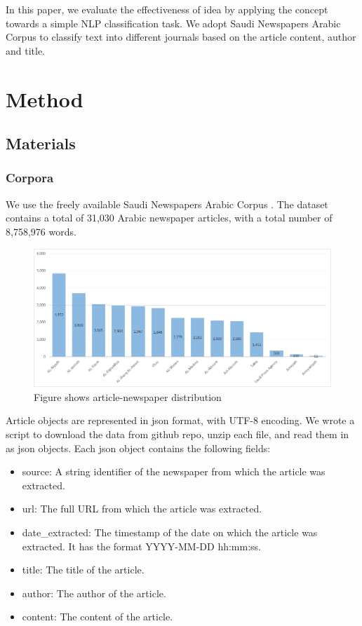 \documentclass[12pt]{article}
\begin{document}
In this paper, we evaluate the effectiveness of idea by applying the concept towards a simple NLP classification task. We adopt Saudi Newspapers Arabic Corpus \cite{hagrima2015} to classify text into different journals based on the article content, author and title.

\section{Method}\label{method}
\subsection{Materials}
\subsubsection{Corpora}
We use the freely available Saudi Newspapers Arabic Corpus \cite{hagrima2015}. The dataset contains a total of 31,030 Arabic newspaper articles, with a total number of 8,758,976 words. 

\begin{figure}[h!]
\centering
\includegraphics[width=\textwidth]{figures/article-newspaper_distribution.png}
\caption{Figure shows article-newspaper distribution}
\end{figure}

Article objects are represented in json format, with UTF-8 encoding. We wrote a script to download the data from github repo, unzip each file, and read them in as json objects. Each json object contains the following fields:

\begin{itemize}
\item source: A string identifier of the newspaper from which the article was extracted.
\item url: The full URL from which the article was extracted.
\item date\_extracted: The timestamp of the date on which the article was extracted. It has the format YYYY-MM-DD hh:mm:ss. 
\item title: The title of the article. 
\item author: The author of the article.
\item content: The content of the article.
\end{itemize}
\end{document}
